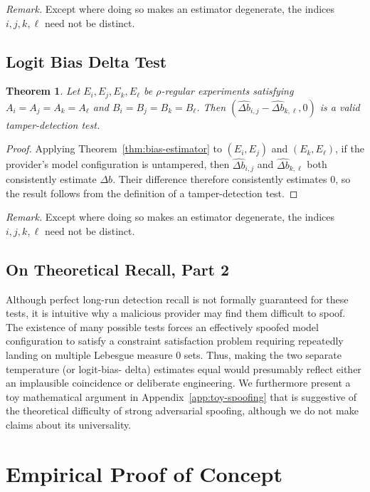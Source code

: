 \documentclass{article}
\newtheorem{theorem}{Theorem}
\begin{document}
\emph{Remark.} Except where doing so makes an estimator degenerate, the indices
$i,j,k,\ell$ need not be distinct.

\subsection{Logit Bias Delta Test}

\begin{theorem}
\label{thm:logit-bias-delta-test}
Let $E_i,E_j,E_k,E_\ell$ be $\rho$-regular experiments satisfying
$A_i=A_j=A_k=A_\ell$ and $B_i=B_j=B_k=B_\ell$. Then
$(\widehat{\Delta b}_{i,j}-\widehat{\Delta b}_{k,\ell},0)$ is a valid
tamper-detection test.
\end{theorem}
\begin{proof}
Applying Theorem~\ref{thm:bias-estimator} to $(E_i,E_j)$ and $(E_k,E_\ell)$,
if the provider's model configuration is untampered, then
$\widehat{\Delta b}_{i,j}$ and $\widehat{\Delta b}_{k,\ell}$ both consistently
estimate $\Delta b$. Their difference therefore consistently estimates $0$,
so the result follows from the definition of a tamper-detection test.
\end{proof}

\emph{Remark.} Except where doing so makes an estimator degenerate, the indices
$i,j,k,\ell$ need not be distinct.

\subsection{On Theoretical Recall, Part 2}
\label{sec:on-recall-part-2}

Although perfect long-run detection recall is not formally guaranteed for these tests, it is
intuitive why a malicious provider may find them difficult to spoof. The
existence of many possible tests forces an effectively spoofed model configuration to satisfy a constraint
satisfaction problem requiring repeatedly landing on multiple Lebesgue measure 0 sets. Thus, making the two separate temperature (or logit-bias-
delta) estimates equal would presumably reflect either an implausible coincidence or
deliberate engineering. We furthermore present a toy mathematical argument in
Appendix~\ref{app:toy-spoofing} that is suggestive of the theoretical difficulty of strong
adversarial spoofing, although we do not make claims about its universality.

\section{Empirical Proof of Concept}
\end{document}

